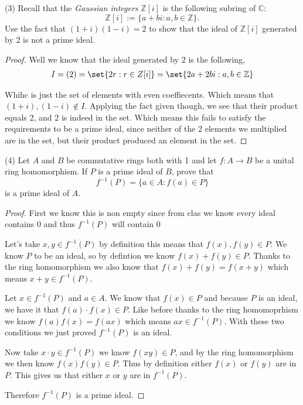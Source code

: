 \documentclass[12pt]{article}
\DeclarePairedDelimiter\set\{\}
\newcommand      {\Z}         {{\mathbb Z}}
\newcommand      {\C}         {{\mathbb C}}
\begin{document}
(3) Recall that the \textit{Gaussian integers} $\Z[i]$ is the following subring of $\C$:
\begin{equation*}
	\Z[i]:=\{a+bi:a,b\in\Z\}.
\end{equation*}
Use the fact that $(1+i)(1-i)=2$ to show that the ideal of $\Z[i]$ generated by 2 is not a prime ideal.
\begin{proof}
	Well we know that the ideal generated by 2 is the following,
	\begin{align}
		I = (2) = \set{2r : r\in Z[i]} = \set{2a+2bi: a,b\in \Z}
	\end{align}

	Whihc is just the set of elements with even coeffiecents. Which means that $(1+i),(1-i)\notin I$. Applying the fact given though, we see that their product equals 2, and 2 is indeed in the set. Which means this fails to satisfy the requirements to be a prime ideal, since neither of the 2 elements we multiplied are in the set, but their product produced an element in the set. 
\end{proof}
\newpage
(4) Let $A$ and $B$ be commutative rings both with 1 and let $f:A\to B$ be a unital ring homomorphism. If $P$ is a prime ideal of $B$, prove that
\begin{equation*}
	f^{-1}(P)=\{a\in A:f(a)\in P\}
\end{equation*}
is a prime ideal of $A$.
\begin{proof}
	First we know this is non empty since from clas we know every ideal contains $0$ and thus $f^{-1}(P)$ will contain 0 

	Let's take $x,y\in f^{-1}(P)$ by definition this means that $f(x),f(y)\in P$. We know $P$ to be an ideal, so by defintion we know $f(x)+f(y)\in P$. Thanks to the ring homomorphism we also know that $f(x)+ f(y) = f(x+y)$ which means $x+y \in f^{-1}(P)$.

	Let $x\in f^{-1}(P)$ and $a \in A$. We know that $f(x)\in P$ and because $P$ is an ideal, we have it that $f(a)\cdot f(x)\in P$. Like before thanks to the ring homomoprhism we know $f(a)f(x) = f(ax)$ which means $ax \in f^{-1}(P)$. With these two conditions we just proved $f^{-1}(P)$ is an ideal. 

	Now take $x\cdot y\in f^{-1}(P)$ we know $f(xy)\in P$, and by the ring homomorphism we then know $f(x)f(y) \in P$. Thus by definition either $f(x)$ or $f(y)$ are in $P$. This gives us that either $x$ or $y$ are in $f^{-1}(P).$

	Therefore $f^{-1}(P)$ is a prime ideal. 
\end{proof}
\end{document}
